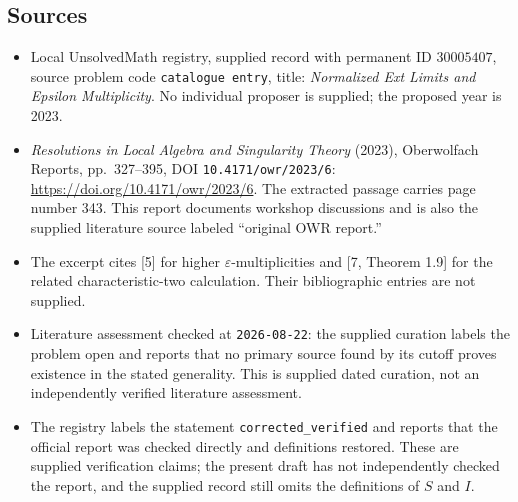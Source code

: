 \documentclass[11pt]{article}
\begin{document}
\subsection{Sources}
\begin{itemize}
\item Local UnsolvedMath registry, supplied record with permanent ID \(30005407\), source problem code \texttt{catalogue entry}, title: \emph{Normalized Ext Limits and Epsilon Multiplicity}. No individual proposer is supplied; the proposed year is 2023.
\item \emph{Resolutions in Local Algebra and Singularity Theory} (2023), Oberwolfach Reports, pp.\ 327--395, DOI \texttt{10.4171/owr/2023/6}: \url{https://doi.org/10.4171/owr/2023/6}. The extracted passage carries page number 343. This report documents workshop discussions and is also the supplied literature source labeled ``original OWR report.''
\item The excerpt cites [5] for higher \(\varepsilon\)-multiplicities and [7, Theorem 1.9] for the related characteristic-two calculation. Their bibliographic entries are not supplied.
\item Literature assessment checked at \texttt{2026-08-22}: the supplied curation labels the problem open and reports that no primary source found by its cutoff proves existence in the stated generality. This is supplied dated curation, not an independently verified literature assessment.
\item The registry labels the statement \texttt{corrected\_verified} and reports that the official report was checked directly and definitions restored. These are supplied verification claims; the present draft has not independently checked the report, and the supplied record still omits the definitions of \(S\) and \(I\).
\end{itemize}
\end{document}
